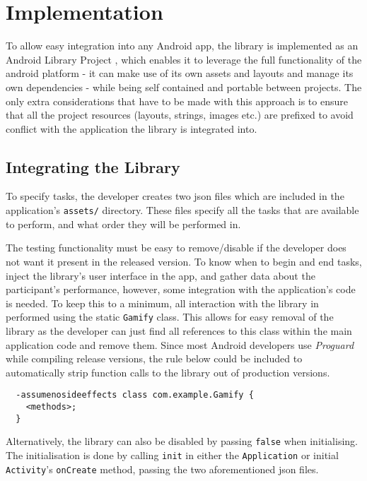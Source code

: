 \chapter{Implementation}

To allow easy integration into any Android app, the library is implemented
as an Android Library Project \cite{android-library}, which enables it to leverage the 
full functionality of the android platform - it can make use of its own assets and
layouts and manage its own dependencies - while being self contained and portable between 
projects. The only extra considerations that have to be made with this approach is to ensure
that all the project resources (layouts, strings, images etc.) are prefixed to avoid conflict
with the application the library is integrated into.

\section{Integrating the Library}

To specify tasks, the developer creates two json files which are
included in the application's \verb+assets/+ directory. These files specify all the tasks that are available to perform, and what order they will be performed in.

The testing functionality must be easy to remove/disable if the developer
does not want it present in the released version. To know when to begin and end tasks,
inject the library's user interface in the app, and gather data about the participant's 
performance, however, some integration with the application's code is needed.
To keep this to a minimum, all interaction with
the library in performed using the static \verb/Gamify/ class. This allows for
easy removal of the library as the developer can just find all references to
this class within the main application code and remove them. Since most Android
developers use \emph{Proguard} while compiling release versions, the rule below could be
included to automatically strip function calls to the library out of production versions.

\begin{verbatim}
  -assumenosideeffects class com.example.Gamify {
    <methods>;
  }
\end{verbatim}

Alternatively, the library can also be disabled by passing \verb|false| when initialising. The
initialisation is done by calling \verb|init| in either the \verb|Application|
or initial \verb|Activity|'s \verb|onCreate| method, passing the two
aforementioned json files.

